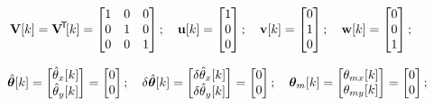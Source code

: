 \documentclass[UTF8,11pt,a4paper]{ctexart}
\newcommand{\tp}{^{\!\mathsf{T}}}
\newcommand{\Vk}{\mathbf{V}[k]}
\newcommand{\VkT}{\mathbf{V}\tp\![k]}
\newcommand{\thhat}[1]{\hat{\theta}_{#1}[k]}    %
\begin{document}
\begin{align}
\Vk &= \VkT = \begin{bmatrix}1&0&0\\0&1&0\\0&0&1\end{bmatrix};\quad
\mathbf{u}[k] = \begin{bmatrix}1\\0\\0\end{bmatrix};\quad
\mathbf{v}[k] = \begin{bmatrix}0\\1\\0\end{bmatrix};\quad
\mathbf{w}[k] = \begin{bmatrix}0\\0\\1\end{bmatrix}; \notag
\end{align}

\begin{align}
\hat{\bm{\theta}}[k]
= \begin{bmatrix}\thhat{x}\\\thhat{y}\end{bmatrix}
= \begin{bmatrix}0\\0\end{bmatrix};\quad
\delta\hat{\bm{\theta}}[k]
= \begin{bmatrix}\delta\thhat{x}\\\delta\thhat{y}\end{bmatrix}
= \begin{bmatrix}0\\0\end{bmatrix};\quad
\bm{\theta}_m[k]
= \begin{bmatrix}\theta_{mx}[k]\\\theta_{my}[k]\end{bmatrix}
= \begin{bmatrix}0\\0\end{bmatrix}; \notag
\end{align}
\end{document}
